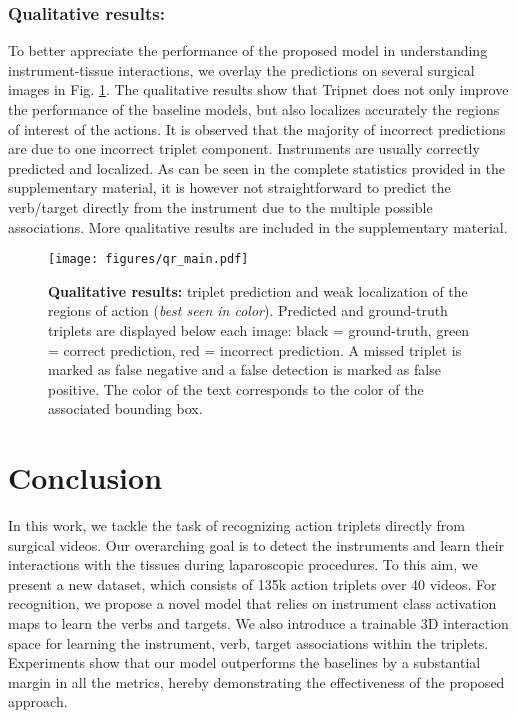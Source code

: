 \documentclass[english,runningheads,a4paper]{llncs}
\begin{document}
\subsubsection{Qualitative results: }
To better appreciate the performance of the proposed model in understanding instrument-tissue interactions, we overlay the predictions on several surgical images in Fig. \ref{fig:successfailures}. 
The qualitative results show that Tripnet does not only improve the performance of the baseline models, but also localizes accurately the regions of interest of the actions. 
It is observed that the majority of incorrect predictions are due to one incorrect triplet component. Instruments are usually correctly predicted and localized. As can be seen in the complete statistics provided in the supplementary material, it is however not straightforward to predict the verb/target directly from the instrument due to the multiple possible associations. More qualitative results are included in the supplementary material.

\begin{figure}[tb]
\texttt{[image: figures/qr\_main.pdf]}
\caption{\textbf{Qualitative results:} triplet prediction and weak localization of the regions of action (\textit{best seen in color}). Predicted and ground-truth triplets are displayed below each image: black = ground-truth, green = correct prediction, red = incorrect prediction. 
A missed triplet is marked as false negative and a false detection is marked as false positive. 
The color of the text  corresponds to the color of the associated bounding box. }
\label{fig:successfailures}
\end{figure}

 \section{Conclusion} 
In this work, we tackle the task of recognizing action triplets directly from surgical videos. Our overarching goal is to detect the instruments and learn their interactions with the tissues during laparoscopic procedures. To this aim, we present a new dataset, which consists of 135k action triplets over 40 videos. For recognition, we  propose a novel model that relies on instrument class activation maps to learn the verbs and targets. We also introduce a trainable 3D interaction space for learning the \textlangle{}instrument, verb, target\textrangle{} associations within the triplets. Experiments show that our model outperforms the baselines by a substantial margin in all the metrics, hereby demonstrating the effectiveness of the proposed approach.
\end{document}
